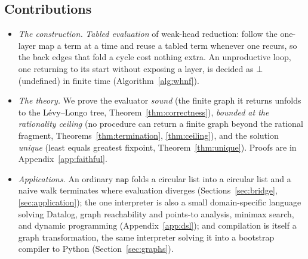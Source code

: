 \subsection{Contributions}
\begin{itemize}
  \item \emph{The construction.} \emph{Tabled evaluation} of weak-head reduction: follow the
    one-layer map a term at a time and reuse a tabled term whenever one recurs, so the back
    edges that fold a cycle cost nothing extra. An unproductive loop, one returning to its
    start without exposing a layer, is decided as $\bot$ (undefined) in finite time
    (Algorithm~\ref{alg:whnf}).
  \item \emph{The theory.} We prove the evaluator \emph{sound} (the finite graph it returns
    unfolds to the L\'evy--Longo tree, Theorem~\ref{thm:correctness}), \emph{bounded at the rationality ceiling} (no
      procedure can return a finite graph beyond the rational fragment,
      Theorems~\ref{thm:termination},
    \ref{thm:ceiling}), and the solution
    \emph{unique} (least equals greatest fixpoint,
    Theorem~\ref{thm:unique}). Proofs are in Appendix~\ref{app:faithful}.
  \item \emph{Applications.} An ordinary
    $\mathtt{map}$ folds a circular list into a circular list and a naive walk terminates where
    evaluation diverges (Sections~\ref{sec:bridge}, \ref{sec:application}); the one interpreter is also a small
    domain-specific language solving Datalog, graph reachability and points-to analysis, minimax
    search, and dynamic programming (Appendix~\ref{app:dsl}); and compilation is itself a graph
    transformation, the same interpreter solving it into a bootstrap compiler to Python
    (Section~\ref{sec:graphs}).
\end{itemize}

